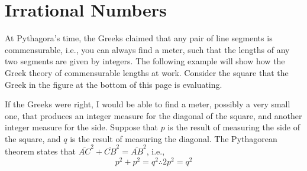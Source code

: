 \documentclass[a4paper,12pt]{book}
\begin{document}
\section{Irrational Numbers}
At Pythagora's time, the Greeks claimed that
any pair of line segments is commensurable, i.e.,
you can always find a meter,
such that the lengths of any two segments
are given by integers.  The following
example will
show how the Greek theory of commensurable lengths at work.
Consider the square that the Greek in the figure
at the bottom of this page is evaluating.


If the Greeks were right, I would be able to find a meter, possibly a very small one,
that produces an integer measure for the diagonal of the square,
and another integer measure for the side. Suppose that $p$ is the
result of measuring the side of the square, and $q$ is the result of measuring the diagonal.
The Pythagorean theorem states that
$\overline{AC}^2+\overline{CB}^2= \overline{AB}^2$, i.e.,
\begin{equation}
p^2+p^2= q^2\therefore 2p^2=q^2\label{Pytagoras1}
\end{equation}
\end{document}
